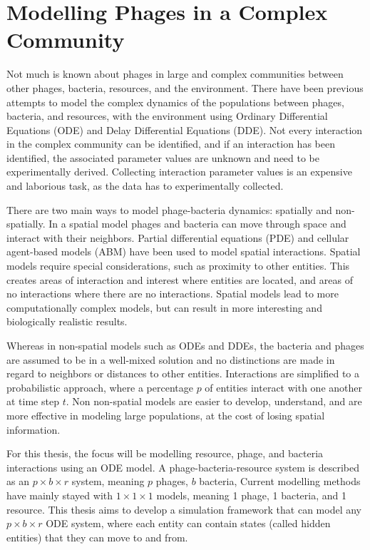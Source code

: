 \section{Modelling Phages in a Complex Community}
Not much is known about phages in large and complex communities between other phages, bacteria, resources, and the environment. 
There have been previous attempts to model the complex dynamics of the populations between phages, bacteria, and resources, with the environment using Ordinary Differential Equations (ODE) and Delay Differential Equations (DDE).
Not every interaction in the complex community can be identified, and if an interaction has been identified, the associated parameter values are unknown and need to be experimentally derived. 
Collecting interaction parameter values is an expensive and laborious task, as the data has to experimentally collected. 

There are two main ways to model phage-bacteria dynamics: spatially and non-spatially.
In a spatial model phages and bacteria can move through space and interact with their neighbors. 
Partial differential equations (PDE) and cellular agent-based models (ABM) have been used to model spatial interactions.
Spatial models require special considerations, such as proximity to other entities.
This creates areas of interaction and interest where entities are located, and areas of no interactions where there are no interactions.
Spatial models lead to more computationally complex models, but can result in more interesting and biologically realistic results. 

Whereas in non-spatial models such as ODEs and DDEs, the bacteria and phages are assumed to be in a well-mixed solution and no distinctions are made in regard to neighbors or distances to other entities. 
Interactions are simplified to a probabilistic approach, where a percentage $p$ of entities interact with one another at time step $t$.
Non non-spatial models are easier to develop, understand, and are more effective in modeling large populations, at the cost of losing spatial information. 

For this thesis, the focus will be modelling resource, phage, and bacteria interactions using an ODE model. 
A phage-bacteria-resource system is described as an $p\times b \times r$ system, meaning $p$ phages, $b$ bacteria, 
Current modelling methods have mainly stayed with $1\times 1 \times 1$ models, meaning 1 phage, 1 bacteria, and 1 resource. 
This thesis aims to develop a simulation framework that can model any $p\times b \times r$ ODE system, where each entity can contain states (called hidden entities) that they can move to and from. 
\newline 

